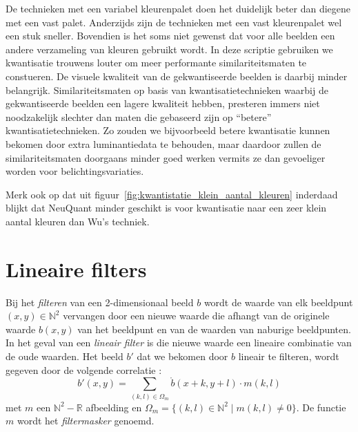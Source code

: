 De technieken met een variabel kleurenpalet doen het duidelijk beter dan diegene met een vast palet. 
Anderzijds zijn de technieken met een vast kleurenpalet wel een stuk sneller. Bovendien is het soms niet
gewenst dat voor alle beelden een andere verzameling van kleuren gebruikt wordt. In deze scriptie gebruiken
we kwantisatie trouwens louter om meer performante similariteitsmaten te constueren. De visuele kwaliteit
van de gekwantiseerde beelden is daarbij minder belangrijk. Similariteitsmaten op basis van kwantisatietechnieken 
waarbij de gekwantiseerde beelden een lagere kwaliteit hebben, presteren immers niet noodzakelijk
slechter dan maten die gebaseerd zijn op ``betere'' kwantisatietechnieken. Zo zouden we bijvoorbeeld 
betere kwantisatie kunnen bekomen door extra luminantiedata te behouden, maar daardoor zullen
de similariteitsmaten doorgaans minder goed werken vermits ze dan gevoeliger worden voor 
belichtingsvariaties.

Merk ook op dat uit figuur~\ref{fig:kwantistatie_klein_aantal_kleuren} inderdaad blijkt
dat NeuQuant minder geschikt is voor kwantisatie naar een zeer klein
aantal kleuren dan Wu's techniek. 

\section{Lineaire filters}
\label{sectie:lineaire_filters}

Bij het \emph{filteren} van een 2-dimensionaal beeld $b$ wordt de waarde van elk beeldpunt $(x,y) \in \mathbb{N}^2$ 
vervangen door een nieuwe waarde die afhangt van de originele waarde $b(x,y)$ van het beeldpunt en van de waarden 
van naburige beeldpunten. In het geval van een \emph{lineair filter} is die nieuwe waarde een lineaire combinatie 
van de oude waarden. Het beeld $b'$ dat we bekomen door $b$ lineair te filteren, wordt gegeven door
de volgende correlatie \cite{philips:beeldverwerking}:
$$
b'(x,y) = \sum_{(k,l) \in \Omega_m} \mathring{b}(x+k,y+l) \cdot m(k,l)
$$
met $m$ een $\mathbb{N}^2 - \mathbb{R}$ afbeelding en $\Omega_m = \{ (k,l) \in \mathbb{N}^2 \mid m(k,l) \ne 0 \}$. 
De functie $m$ wordt het \emph{filtermasker} genoemd.


